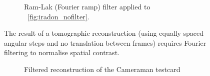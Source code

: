 \documentclass{osa-article}
\begin{document}
\begin{figure}
\begin{subfigure}[t]{0.3\linewidth}
    \caption[Filtered iRadon]{Ram-Lak (Fourier ramp) filter applied to \figurename~\ref{fig:iradon_nofilter}.}\label{fig:iradon_filter}
  \end{subfigure}
  \hspace*{\fill}
  \caption[Effects of filtering the result of a inverse Radon transform reconstruction]{
    The result of a tomographic reconstruction (using equally spaced angular steps and no translation between frames) requires Fourier filtering to normalise spatial contrast.}\label{fig:irandons}%
\end{figure}


\begin{figure}
  \centering
  \hspace*{\fill}
  \begin{subfigure}[t]{0.3\linewidth}
    \caption{Filtered reconstruction of the Cameraman testcard}
  \end{subfigure}\hfill
  \begin{subfigure}[t]{0.3\linewidth}
    \begin{tikzpicture}[node distance=0cm]

\end{tikzpicture}
\end{subfigure}
\end{figure}
\end{document}

